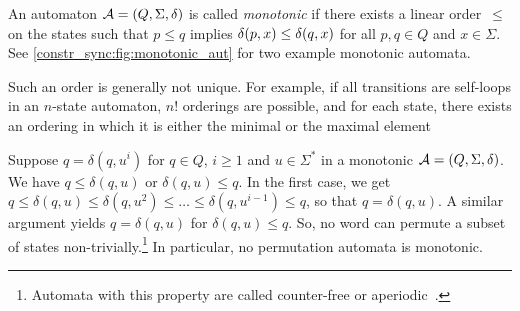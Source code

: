 
An automaton $\mathcal A = (Q, \Sigma, \delta)$
is called \emph{monotonic} if there exists a linear order~$\le$ on the states
such that $p \le q$ implies $\delta(p,x) \le \delta(q,x)$
for all $p, q \in Q$ and $x \in \Sigma$.
See \cref{constr_sync:fig:monotonic_aut} for two example monotonic automata.

Such an order is generally not unique.  
For example, if all transitions are self-loops in an $n$-state automaton, $n!$ orderings are possible, 
and for each state, there exists an ordering in which it is either the minimal or the maximal element

Suppose $q = \delta(q, u^i)$ for $q \in Q$, $i \ge 1$ and $u \in\Sigma^*$ in a monotonic $\mathcal A = (Q, \Sigma, \delta)$.
We have $q \le \delta(q, u)$ or $\delta(q, u) \le q$.
In the first case, we get $q \le \delta(q, u) \le \delta(q, u^2) \le \ldots \le \delta(q, u^{i-1}) \le q$,
so that $q = \delta(q, u)$.
A similar argument yields $q = \delta(q, u)$
for $\delta(q, u) \le q$.
So, no word can permute a subset of states
non-trivially.\footnote{Automata with this property are called counter-free or aperiodic~\cite{McNaughton71}.}
In particular, no permutation automata is monotonic.

